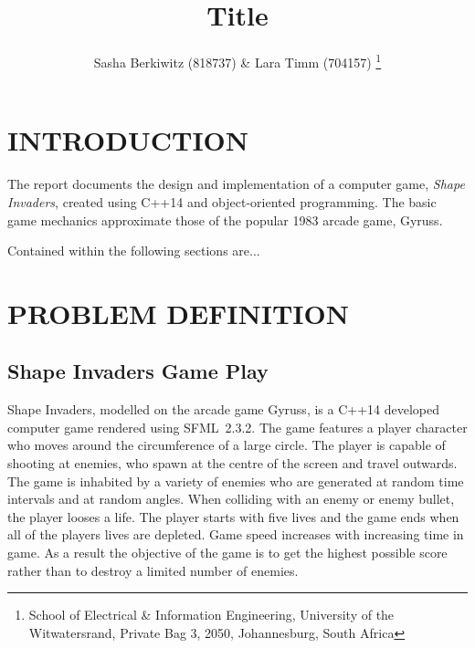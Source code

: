 \documentclass[10pt,twocolumn]{witseiepaper}
\begin{document}
\title{Title}

\author{Sasha Berkiwitz (818737) \& Lara Timm (704157)
\thanks{School of Electrical \& Information Engineering, University of the
Witwatersrand, Private Bag 3, 2050, Johannesburg, South Africa}
}


%
\abstract{}

\keywords{}


\maketitle
\pagestyle{plain}
\setcounter{page}{1}


\section{INTRODUCTION}

The report documents the design and implementation of a computer game, \textit{Shape Invaders}, created using C++14 and object-oriented programming. The basic game mechanics approximate those of the popular 1983 arcade game, Gyruss. 

Contained within the following sections are...

\section{PROBLEM DEFINITION}\label{probDef}


\subsection{Shape Invaders Game Play}

Shape Invaders, modelled on the arcade game Gyruss, is a C++14 developed computer game rendered using SFML~2.3.2. The game features a player character who moves around the circumference of a large circle. The player is capable of shooting at enemies, who spawn at the centre of the screen and travel outwards. The game is inhabited by a variety of enemies who are generated at random time intervals and at random angles. When colliding with an enemy or enemy bullet, the player looses a life. The player starts with five lives and the game ends when all of the players lives are depleted. Game speed increases with increasing time in game. As a result the objective of the game is to get the highest possible score rather than to destroy a limited number of enemies.
\end{document}
